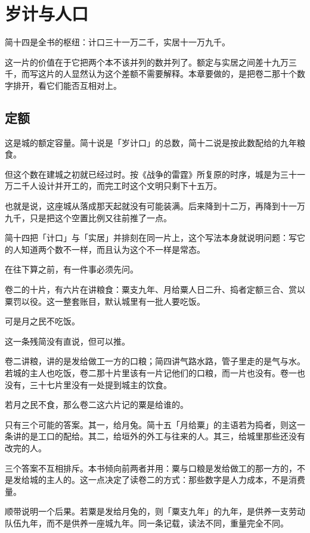 \chapter{岁计与人口}

简十四是全书的枢纽：计口三十一万二千，实居十一万九千。

这一片的价值在于它把两个本不该并列的数并列了。额定与实居之间差十九万三千，而写这片的人显然认为这个差额不需要解释。本章要做的，是把卷二那十个数字排开，看它们能否互相对上。

\section{定额}

这是城的额定容量。简十说是「岁计口」的总数，简十二说是按此数配给的九年粮食。

但这个数在建城之初就已经过时。按《战争的雷霆》所复原的时序，城是为三十一万二千人设计并开工的，而完工时这个文明只剩下十五万。

也就是说，这座城从落成那天起就没有可能装满。后来降到十二万，再降到十一万九千，只是把这个空置比例又往前推了一点。

简十四把「计口」与「实居」并排刻在同一片上，这个写法本身就说明问题：写它的人知道两个数不一样，而且认为这个不一样是常态。

在往下算之前，有一件事必须先问。

卷二的十片，有六片在讲粮食：粟支九年、月给粟人日二升、捣者定额三合、赏以粟罚以役。这一整套账目，默认城里有一批人要吃饭。

可是月之民不吃饭。

这一条残简没有直说，但可以推。

卷二讲粮，讲的是发给做工一方的口粮；简四讲气路水路，管子里走的是气与水。若城的主人也吃饭，卷二那十片里该有一片记他们的口粮，而一片也没有。卷一也没有，三十七片里没有一处提到城主的饮食。

若月之民不食，那么卷二这六片记的粟是给谁的。

只有三个可能的答案。其一，给月兔。简十五「月给粟」的主语若为捣者，则这一条讲的是工口的配给。其二，给垣外的外工与往来的人。其三，给城里那些还没有改完的人。

三个答案不互相排斥。本书倾向前两者并用：粟与口粮是发给做工的那一方的，不是发给城的主人的。这一点决定了读卷二的方式：那些数字是人力成本，不是消费量。

顺带说明一个后果。若粟是发给月兔的，则「粟支九年」的九年，是供养一支劳动队伍九年，而不是供养一座城九年。同一条记载，读法不同，重量完全不同\nobreak。

